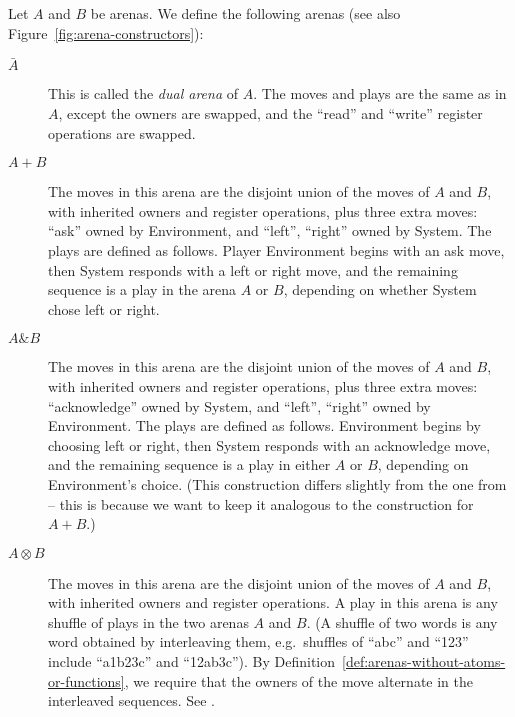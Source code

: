 \documentclass[a4paper,UKenglish,cleveref, autoref, numberwithinsect, thm-restate]{lipics-v2021}
\begin{document}
\begin{definition}\label{def:composition-of-arenas}
    Let  $A$ and $B$ be arenas. We define the following arenas (see also Figure~\ref{fig:arena-constructors}):
        \begin{description}
            \item[$\bar A$] This is called the \emph{dual arena} of $A$. The moves and plays are the same as in $A$, except the owners are swapped, and the ``read'' and ``write'' register operations are swapped.
            \item[$A+B$] The moves in this arena are the disjoint union of the moves of $A$ and $B$, with inherited owners and register operations, plus three extra moves: ``ask'' owned by Environment, and ``left'', ``right'' owned by System. 
            The plays are defined as follows. Player Environment begins with  an ask move, then System responds with a left or right move, and the remaining sequence is a play in the arena $A$ or $B$, depending on whether System chose left or right. 
            \item[$A \& B$] The moves in this arena are the disjoint union of the moves of $A$ and $B$, with inherited owners and register operations, plus three extra moves: ``acknowledge'' owned by System, and ``left'', ``right'' owned by Environment. 
            The plays are defined as follows. Environment begins by choosing left or right, then System responds with an acknowledge move, and the remaining sequence is a play in either $A$ or $B$, depending on Environment's choice.
            (This construction differs slightly from the one from \cite[Exercise~1.10]{abramsky2013semantics} -- this is because we want to keep it analogous to the construction for $A + B$.)
            \item[$A \otimes B$] The moves in this arena are the disjoint union of the moves of $A$ and $B$, with inherited owners and register operations. A play in this arena is any shuffle of plays in the two arenas $A$ and $B$. (A shuffle of two words is any word obtained by interleaving them, e.g.~shuffles of ``abc'' and ``123'' include ``a1b23c'' and ``12ab3c'').
            By Definition~\ref{def:arenas-without-atoms-or-functions}, we require that the owners of the move alternate in the 
            interleaved sequences. See \cite[p.7]{abramsky2013semantics}.
        \end{description} 
\end{definition}
\end{document}
